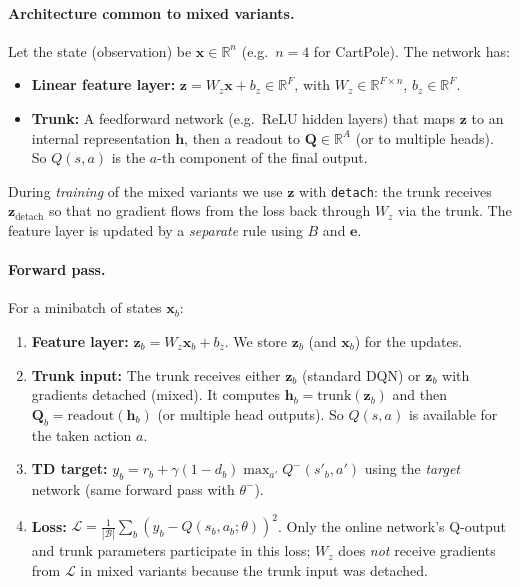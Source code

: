 \documentclass[11pt]{article}
\begin{document}
\paragraph{Architecture common to mixed variants.} Let the state (observation) be $\mathbf{x} \in \mathbb{R}^n$ (e.g.\ $n=4$ for CartPole). The network has:
\begin{itemize}
\item \textbf{Linear feature layer:} $\mathbf{z} = W_z \mathbf{x} + b_z \in \mathbb{R}^F$, with $W_z \in \mathbb{R}^{F \times n}$, $b_z \in \mathbb{R}^F$.
\item \textbf{Trunk:} A feedforward network (e.g.\ ReLU hidden layers) that maps $\mathbf{z}$ to an internal representation $\mathbf{h}$, then a readout to $\mathbf{Q} \in \mathbb{R}^A$ (or to multiple heads). So $Q(s,a)$ is the $a$-th component of the final output.
\end{itemize}
During \emph{training} of the mixed variants we use $\mathbf{z}$ with \texttt{detach}: the trunk receives $\mathbf{z}_{\mathrm{detach}}$ so that no gradient flows from the loss back through $W_z$ via the trunk. The feature layer is updated by a \emph{separate} rule using $B$ and $\mathbf{e}$.

\paragraph{Forward pass.} For a minibatch of states $\mathbf{x}_b$:
\begin{enumerate}
\item \textbf{Feature layer:} $\mathbf{z}_b = W_z \mathbf{x}_b + b_z$. We store $\mathbf{z}_b$ (and $\mathbf{x}_b$) for the updates.
\item \textbf{Trunk input:} The trunk receives either $\mathbf{z}_b$ (standard DQN) or $\mathbf{z}_b$ with gradients detached (mixed). It computes $\mathbf{h}_b = \mathrm{trunk}(\mathbf{z}_b)$ and then $\mathbf{Q}_b = \mathrm{readout}(\mathbf{h}_b)$ (or multiple head outputs). So $Q(s,a)$ is available for the taken action $a$.
\item \textbf{TD target:} $y_b = r_b + \gamma(1-d_b) \max_{a'} Q^-(s'_b, a')$ using the \emph{target} network (same forward pass with $\theta^-$).
\item \textbf{Loss:} $\mathcal{L} = \frac{1}{|\mathcal{B}|} \sum_b (y_b - Q(s_b, a_b; \theta))^2$. Only the online network's Q-output and trunk parameters participate in this loss; $W_z$ does \emph{not} receive gradients from $\mathcal{L}$ in mixed variants because the trunk input was detached.
\end{enumerate}
\end{document}
